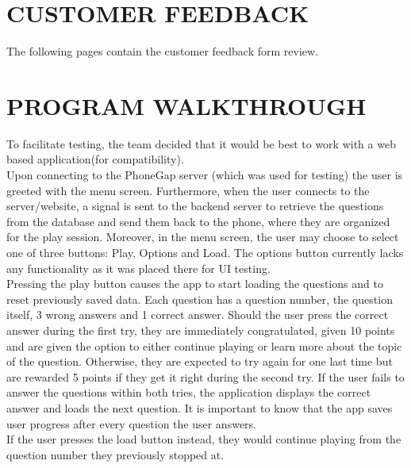 \documentclass[paper=a4,fontsize=11pt]{article}
\newcommand{\MainSection}[1]{\section*{\uppercase{#1}}}
\begin{document}
\MainSection{Customer Feedback}
The following pages contain the customer feedback form review.




\newpage


\MainSection{Program Walkthrough}
To facilitate testing, the team decided that it would be best to work with a
web based application(for compatibility).\\

\noindent
Upon connecting to the PhoneGap server (which was used for testing) the user is
greeted with the menu screen. Furthermore, when the user connects to the server/website,
a signal is sent to the backend server to retrieve the questions from the database
and send them back to the phone, where they are organized for the play session.
Moreover, in the menu screen, the user may choose to select one of three
buttons: Play, Options and Load. The options button currently lacks any functionality
as it was placed there for UI testing.\\

\noindent
Pressing the play button causes the app to start loading the questions and to reset previously saved data.
Each question has a question number, the question itself, 3 wrong answers and 1 correct answer.
Should the user press the correct answer during the first try, they are immediately
congratulated, given 10 points and are given the option to either continue playing
or learn more about the topic of the question. Otherwise, they are expected to try
again for one last time but are rewarded 5 points if they get it right during the
second try. If the user fails to answer the questions within both tries, the application
displays the correct answer and loads the next question. It is important to know
that the app saves user progress after every question the user answers.\\

\noindent
If the user presses the load button instead, they would continue playing from the question
number they previously stopped at.\\\\
\end{document}
